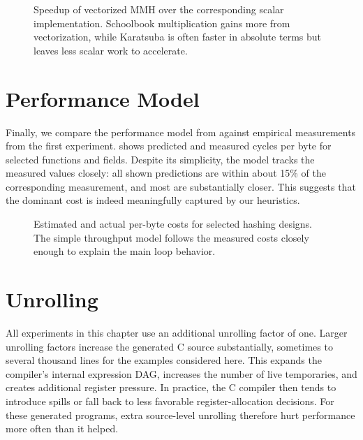 \begin{figure}[!htbp]
    \centering
    \resizebox{\textwidth}{!}{%
        
    }
    \caption{Speedup of vectorized MMH over the corresponding scalar implementation. Schoolbook multiplication gains more from vectorization, while Karatsuba is often faster in absolute terms but leaves less scalar work to accelerate.}
    \label{fig:sweep_speedup_mmh}
\end{figure}
\clearpage

\section{Performance Model}
\label{sec:evaluation-performance-model}

Finally, we compare the performance model from  against empirical measurements from the first experiment.  shows predicted and measured cycles per byte for selected functions and fields. Despite its simplicity, the model tracks the measured values closely: all shown predictions are within about 15\% of the corresponding measurement, and most are substantially closer. This suggests that the dominant cost is indeed meaningfully captured by our heuristics.

\begin{figure}[!htbp]
    \centering
    \resizebox{\textwidth}{!}{%
        
    }
    \caption{Estimated and actual per-byte costs for selected hashing designs. The simple throughput model follows the measured costs closely enough to explain the main loop behavior.}
    \label{fig:performance_model}
\end{figure}
\clearpage

\section{Unrolling}
\label{sec:evaluation-unrolling}

All experiments in this chapter use an additional unrolling factor of one. Larger unrolling factors increase the generated C source substantially, sometimes to several thousand lines for the examples considered here. This expands the compiler's internal expression DAG, increases the number of live temporaries, and creates additional register pressure. In practice, the C compiler then tends to introduce spills or fall back to less favorable register-allocation decisions. For these generated programs, extra source-level unrolling therefore hurt performance more often than it helped.

